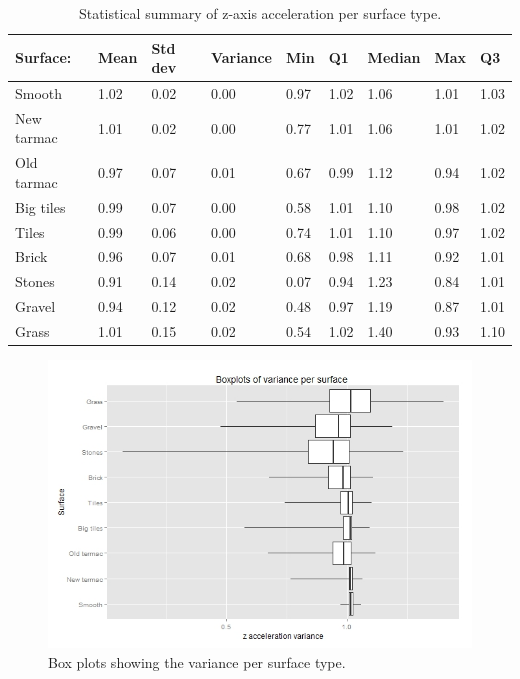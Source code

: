 \begin{table}[ht]
\caption{Statistical summary of z-axis acceleration per surface type. \label{surfacehindrance}}
\centering
\begin{tabular}{|p{46pt}|p{30pt}|p{30pt}|p{30pt}|p{30pt}|p{30pt}|p{30pt}|p{30pt}|p{30pt}|}
\hline
Surface: & Mean & Std dev & Variance & Min & Q1 & Median & Max & Q3\\
\hline
Smooth & 1.02 & 0.02 & 0.00 & 0.97 & 1.02 & 1.06 & 1.01 & 1.03 \\
New tarmac & 1.01 & 0.02 & 0.00 & 0.77 & 1.01 & 1.06 & 1.01 & 1.02\\
Old tarmac & 0.97 & 0.07 & 0.01 & 0.67 & 0.99 & 1.12 & 0.94 & 1.02\\
Big tiles & 0.99 & 0.07 & 0.00 & 0.58 & 1.01 & 1.10 & 0.98 & 1.02\\
Tiles & 0.99 & 0.06 & 0.00 & 0.74 & 1.01 & 1.10 & 0.97 & 1.02\\
Brick & 0.96 & 0.07 & 0.01 & 0.68 & 0.98 & 1.11 & 0.92 & 1.01\\
Stones & 0.91 & 0.14 & 0.02 & 0.07 & 0.94 & 1.23 & 0.84 & 1.01\\
Gravel & 0.94 & 0.12 & 0.02 & 0.48 & 0.97 & 1.19 & 0.87 & 1.01\\
Grass & 1.01 & 0.15 & 0.02 & 0.54 & 1.02 & 1.40 & 0.93 & 1.10\\
\hline
\end{tabular}
\end{table}

\begin{figure}[hb]
\includegraphics[width=\textwidth]{img/R_Surfaces_Variance.jpeg}
\centering
\caption{Box plots showing the variance per surface type.\label{boxhindrance}}
\end{figure} 

